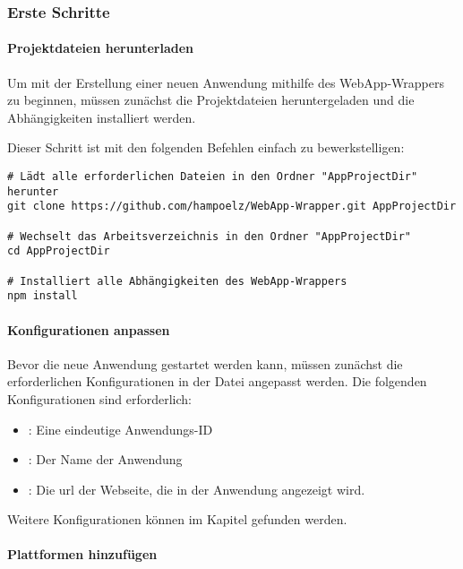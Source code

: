 \subsubsection{Erste Schritte}

\paragraph{Projektdateien herunterladen}

Um mit der Erstellung einer neuen Anwendung mithilfe des WebApp-Wrappers zu beginnen, müssen zunächst die Projektdateien heruntergeladen und die Abhängigkeiten installiert werden.

Dieser Schritt ist mit den folgenden Befehlen einfach zu bewerkstelligen:

\begin{verbatim}
# Lädt alle erforderlichen Dateien in den Ordner "AppProjectDir" herunter
git clone https://github.com/hampoelz/WebApp-Wrapper.git AppProjectDir

# Wechselt das Arbeitsverzeichnis in den Ordner "AppProjectDir"
cd AppProjectDir

# Installiert alle Abhängigkeiten des WebApp-Wrappers
npm install
\end{verbatim}

\paragraph{Konfigurationen anpassen}

Bevor die neue Anwendung gestartet werden kann, müssen zunächst die erforderlichen Konfigurationen in der Datei  angepasst werden. Die folgenden Konfigurationen sind erforderlich:

\begin{itemize}
  \setlength\itemsep{-0.5em}
  \item \textbf{}: Eine eindeutige Anwendungs-ID
  \item \textbf{}: Der Name der Anwendung
  \item \textbf{}: Die \ac{url} der Webseite, die in der Anwendung angezeigt wird.
\end{itemize}

Weitere Konfigurationen können im Kapitel  gefunden werden.

\newpage

\paragraph{Plattformen hinzufügen}

